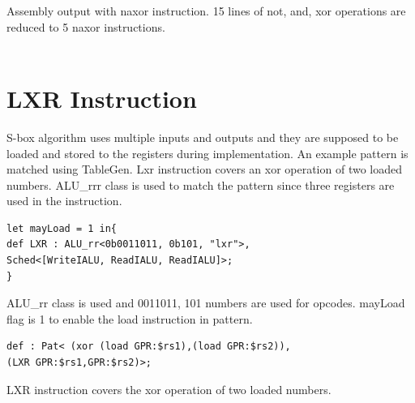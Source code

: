 Assembly output with naxor instruction. 15 lines of not, and, xor operations are reduced to 5 naxor instructions.
\\\\






\section{LXR Instruction}

S-box algorithm uses multiple inputs and outputs and they are supposed to be loaded and stored to the registers during implementation. An example pattern is matched using TableGen. Lxr instruction covers an xor operation of two loaded numbers. ALU\_rrr class is used to match the pattern since three registers are used in the instruction.

\begin{lstlisting}
let mayLoad = 1 in{
def LXR : ALU_rr<0b0011011, 0b101, "lxr">,
Sched<[WriteIALU, ReadIALU, ReadIALU]>;
}
\end{lstlisting}

ALU\_rr class is used and 0011011, 101 numbers are used for opcodes. mayLoad flag is 1 to enable the load instruction in pattern.
\\
\begin{lstlisting}
def : Pat< (xor (load GPR:$rs1),(load GPR:$rs2)),
(LXR GPR:$rs1,GPR:$rs2)>;
\end{lstlisting}

LXR instruction covers the xor operation of two loaded numbers.
\\

